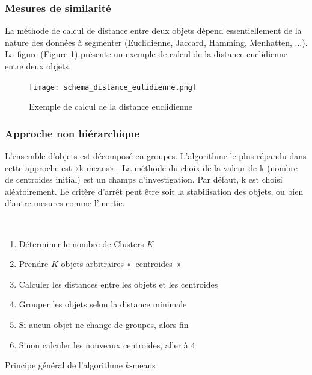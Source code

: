 \documentclass[a4paper,12pt]{report}
\begin{document}
        \subsubsection*{Mesures de similarité}

        La méthode de calcul de distance entre deux objets dépend essentiellement de
        la nature des données à segmenter (Euclidienne, Jaccard, Hamming,
        Menhatten, ...). La figure (Figure \ref{fig:distance_eulidienne}) présente un exemple de calcul de la distance
        euclidienne entre deux objets.
            
        \begin{figure}[h]
            \centering
            \texttt{[image: schema\_distance\_eulidienne.png]}
            \caption{Exemple de calcul de la distance euclidienne}
            \label{fig:distance_eulidienne}
        \end{figure}

        \subsubsection*{Approche non hiérarchique}

        L'ensemble d'objets est décomposé en groupes. L’algorithme le plus répandu
        dans cette approche est «k-means» . La méthode du choix de la
        valeur de k (nombre de centroides initial) est un champs d’investigation. Par
        défaut, k est choisi aléatoirement. Le critère d’arrêt peut être soit la stabilisation
        des objets, ou bien d’autre mesures comme l’inertie. 

\\
        \begin{enumerate}[leftmargin=*]
            \item Déterminer le nombre de Clusters \( K\)
            \item Prendre \( K \) objets arbitraires «~centroides~»
            \item Calculer les distances entre les objets et les centroides
            \item Grouper les objets selon la distance minimale
            \item Si aucun objet ne change de groupes, alors fin
            \item Sinon calculer les nouveaux centroides, aller à 4
        \end{enumerate}
        
        Principe général de l’algorithme \( k \)-means
\end{document}
